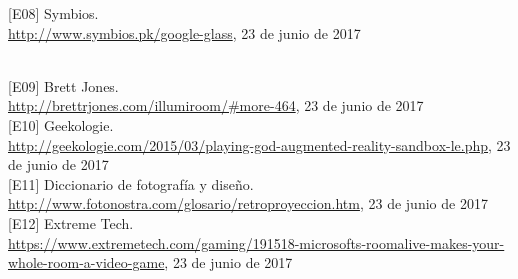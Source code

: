 \documentclass[a4paper,openright,12pt]{report}
\begin{document}
\hypertarget{e08}{[E08] Symbios.\\ \url{http://www.symbios.pk/google-glass}, 23 de junio de 2017}\\

\hypertarget{e09}{[E09] Brett Jones.\\ \url{http://brettrjones.com/illumiroom/\#more-464}, 23 de junio de 2017}\\

\hypertarget{e10}{[E10] Geekologie.\\ \url{http://geekologie.com/2015/03/playing-god-augmented-reality-sandbox-le.php}, 23 de junio de 2017}\\

\hypertarget{e11}{[E11] Diccionario de fotografía y diseño.\\ \url{http://www.fotonostra.com/glosario/retroproyeccion.htm}, 23 de junio de 2017}\\

\hypertarget{e12}{[E12] Extreme Tech.\\ \url{https://www.extremetech.com/gaming/191518-microsofts-roomalive-makes-your-whole-room-a-video-game}, 23 de junio de 2017}\\
\end{document}
